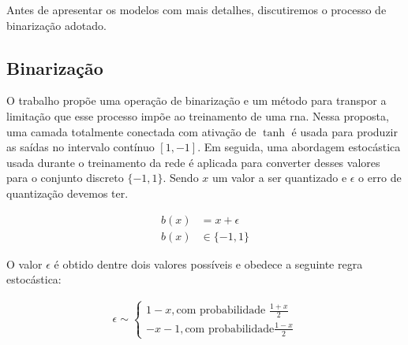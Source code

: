 Antes de apresentar os modelos com mais detalhes, discutiremos o processo de binarização adotado.


\subsection{Binarização}
\label{subsec:bin}



O trabalho \cite{Variable2016Toderici} propõe uma operação de binarização e um método para transpor a limitação que esse processo impõe ao treinamento de uma \acrshort{rna}. 
Nessa proposta, uma camada totalmente conectada com ativação de $\tanh$ é usada para produzir as saídas no intervalo contínuo $[1,-1]$. Em seguida, uma abordagem estocástica usada durante o treinamento da rede é aplicada para converter desses valores para o conjunto discreto $\{- 1, 1\}$. Sendo $x$ um valor a ser quantizado e $\epsilon$ o erro de quantização devemos ter.

\begin{equation}
\begin{aligned}
b(x) &= x + \epsilon  \\
b(x) & \in \{-1, 1\}
\end{aligned}
\end{equation}

O valor $\epsilon$ é obtido dentre dois valores possíveis e obedece a seguinte regra estocástica:

\begin{equation}
\label{eq:quant2}
\begin{aligned}
\epsilon \sim \left\{
\begin{array}{ll}
1 - x, \text{com probabilidade } \frac{1 + x}{2} \\
-x - 1, \text{com probabilidade} \frac{1 - x}{2}
\end{array}
\right. \\
\end{aligned}
\end{equation}


